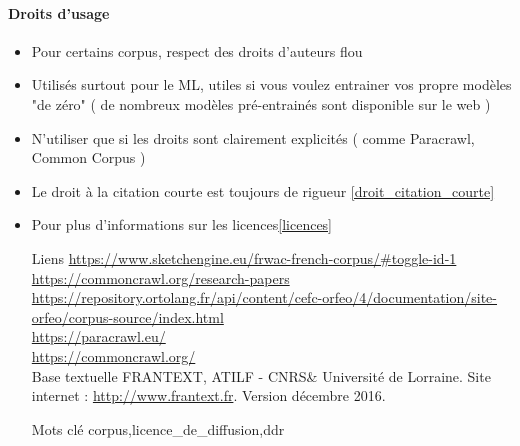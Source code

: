 \documentclass{book}
\newenvironment{titlemize}[1]{%
  \paragraph{#1}
  \begin{itemize}}
  {\end{itemize}}
\begin{document}
\begin{enumerate}
        \begin{titlemize}{Droits d'usage}
            \item Pour certains corpus, respect des droits d'auteurs flou
            \item Utilisés surtout pour le ML, utiles si vous voulez entrainer vos propre modèles "de zéro" ( de nombreux modèles pré-entrainés sont disponible sur le web )
            \item N'utiliser que si les droits sont clairement explicités ( comme Paracrawl, Common Corpus )
            \item Le droit à la citation courte est toujours de rigueur \ref{droit_citation_courte}
            \item Pour plus d'informations sur les licences\ref{licences}
        \end{titlemize}
    
\end{enumerate}

\begin{itemize}
    \item [Liens] %
        \url{https://www.sketchengine.eu/frwac-french-corpus/#toggle-id-1}\\
        \url{https://commoncrawl.org/research-papers}\\
        \url{https://repository.ortolang.fr/api/content/cefc-orfeo/4/documentation/site-orfeo/corpus-source/index.html}\\
        \url{https://paracrawl.eu/}\\
        \url{https://commoncrawl.org/}\\ 
        Base textuelle FRANTEXT, ATILF - CNRS\& Université de Lorraine. Site internet : \url{http://www.frantext.fr}. Version décembre 2016.\\
        \autocite{wissner:hal-03604977}
    \item [Mots clé]
         \gls{corpus},\gls{licence_de_diffusion},\gls{ddr}
\end{itemize}
\end{document}
